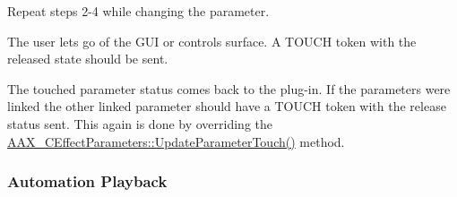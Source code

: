 \begin{DoxyEnumerate}
\item Repeat steps 2-\/4 while changing the parameter.
\item The user lets go of the G\+UI or controls surface. A T\+O\+U\+CH token with the released state should be sent.
\begin{DoxyItemize}
\item The touched parameter status comes back to the plug-\/in. If the parameters were linked the other linked parameter should have a T\+O\+U\+CH token with the release status sent. This again is done by overriding the \mbox{\hyperlink{a01481_a035778f6cccf8cf96a11b3a028efed6e}{A\+A\+X\+\_\+\+C\+Effect\+Parameters\+::\+Update\+Parameter\+Touch()}} method. 
\begin{DoxyCode}{0}
\DoxyCodeLine{\textcolor{comment}{// *******************************************************************************}}
\DoxyCodeLine{\textcolor{comment}{// METHOD:  UpdateParameterTouch}}
\DoxyCodeLine{\textcolor{comment}{// *******************************************************************************}}
\DoxyCodeLine{\{}
\DoxyCodeLine{    \{}
\DoxyCodeLine{        [...]}
\DoxyCodeLine{    \}}
\DoxyCodeLine{    \textcolor{keywordflow}{else}}
\DoxyCodeLine{    \{}
\DoxyCodeLine{        [...]}
\DoxyCodeLine{        [...]}
\DoxyCodeLine{    \}}
\DoxyCodeLine{}
\DoxyCodeLine{\}}
\end{DoxyCode}

\end{DoxyItemize}
\end{DoxyEnumerate}\hypertarget{a00824_linkedParameters_linkedParameterOperation_automationPlayback}{}\subsubsection{Automation Playback}\label{a00824_linkedParameters_linkedParameterOperation_automationPlayback}

